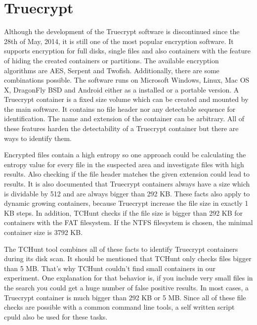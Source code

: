 \section{Truecrypt}
Although the development of the Truecrypt software is discontinued since the 28th of May, 2014, it is still one of the most popular encryption software.
It supports encryption for full disks, single files and also containers with the feature of hiding the created containers or partitions.
The available encryption algorithms are AES, Serpent and Twofish. Additionally, there are some combinations possible.
The software runs on Microsoft Windows, Linux, Mac OS X, DragonFly BSD and Android either as a installed or a portable version.\cite{wiki:truecrypt}
A Truecrypt container is a fixed size volume which can be created and mounted by the main software.
It contains no file header nor any detectable sequence for identification.
The name and extension of the container can be arbitrary.
All of these features harden the detectability of a Truecrypt container but there are ways to identify them.

Encrypted files contain a high entropy so one approach could be calculating the entropy value for every file in the suspected area and investigate files with high results.
Also checking if the file header matches the given extension could lead to results.
It is also documented that Truecrypt containers always have a size which is dividable by 512 and are always bigger than 292 KB.
These facts also apply to dynamic growing containers, because Truecrypt increase the file size in exactly 1 KB steps. 
In addition, TCHunt checks if the file size is bigger than 292 KB for containers with the FAT filesystem. 
If the NTFS filesystem is chosen, the minimal container size is 3792 KB.
\cite{truecrypt:sourceCode}

The TCHunt tool combines all of these facts to identify Truecrypt containers during its disk scan. 
It should be mentioned that TCHunt only checks files bigger than 5 MB.
That's why TCHunt couldn't find small containers in our experiment. 
One explanation for that behavior is, if you include very small files in the search you could get a huge number of false positive results. 
In most cases, a Truecrypt container is much bigger than 292 KB or 5 MB. 
Since all of these file checks are possible with a common command line tools, a self written script cpuld also be used for these tasks.
